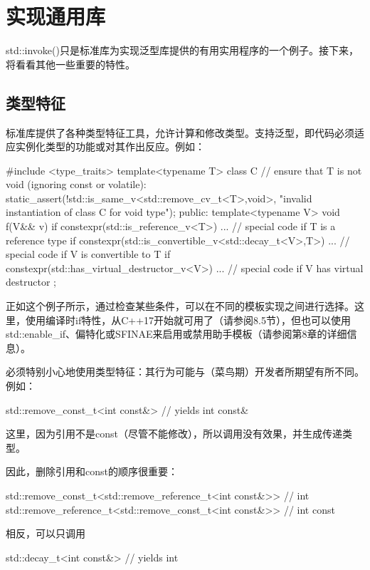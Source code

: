 \section{实现通用库}

std::invoke()只是标准库为实现泛型库提供的有用实用程序的一个例子。接下来，将看看其他一些重要的特性。

\subsection{类型特征}

标准库提供了各种类型特征工具，允许计算和修改类型。支持泛型，即代码必须适应实例化类型的功能或对其作出反应。例如：

\begin{cpp}
#include <type_traits>
template<typename T>
class C {
	// ensure that T is not void (ignoring const or volatile):
	static_assert(!std::is_same_v<std::remove_cv_t<T>,void>,
					"invalid instantiation of class C for void type");
public:
	template<typename V>
	void f(V&& v) {
		if constexpr(std::is_reference_v<T>) {
			... // special code if T is a reference type
		}
		if constexpr(std::is_convertible_v<std::decay_t<V>,T>) {
			... // special code if V is convertible to T
		}
		if constexpr(std::has_virtual_destructor_v<V>) {
			... // special code if V has virtual destructor
		}
	}
};
\end{cpp}

正如这个例子所示，通过检查某些条件，可以在不同的模板实现之间进行选择。这里，使用编译时if特性，从C++17开始就可用了（请参阅8.5节），但也可以使用std::enable\_if、偏特化或SFINAE来启用或禁用助手模板（请参阅第8章的详细信息）。

必须特别小心地使用类型特征：其行为可能与（菜鸟期）开发者所期望有所不同。例如：

\begin{cpp}
std::remove_const_t<int const&> // yields int const&
\end{cpp}

这里，因为引用不是const（尽管不能修改），所以调用没有效果，并生成传递类型。

因此，删除引用和const的顺序很重要：

\begin{cpp}
std::remove_const_t<std::remove_reference_t<int const&>> // int
std::remove_reference_t<std::remove_const_t<int const&>> // int const
\end{cpp}

相反，可以只调用

\begin{cpp}
std::decay_t<int const&> // yields int
\end{cpp}

